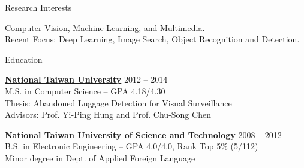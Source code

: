 \documentclass{resume} %
\begin{document}

\begin{rSection}{Research Interests}

Computer Vision, Machine Learning, and Multimedia.\\
Recent Focus: Deep Learning, Image Search, Object Recognition and Detection.

\end{rSection}



\begin{rSection}{Education}

\href{http://www.ntu.edu.tw}{\textbf{National Taiwan University}} \hfill{2012 -- 2014}\\
M.S. in Computer Science -- GPA 4.18/4.30\\
Thesis: Abandoned Luggage Detection for Visual Surveillance\\
Advisors: Prof. Yi-Ping Hung and Prof. Chu-Song Chen


\href{http://www.ntust.edu.tw}{\textbf{National Taiwan University of Science and Technology}} \hfill{2008 -- 2012}\\ 
B.S. in Electronic Engineering -- GPA 4.0/4.0, Rank Top 5\% (5/112)\\
Minor degree in Dept. of Applied Foreign Language


\end{rSection}


\end{document}
